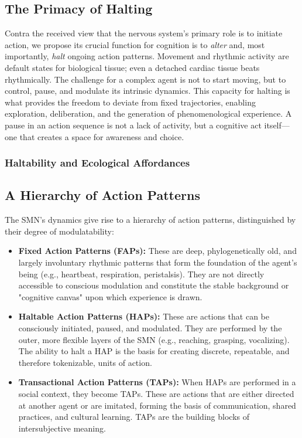 \documentclass[10pt,letterpaper]{article}
\begin{document}
\subsection*{The Primacy of Halting}
Contra the received view that the nervous system's primary role is to initiate action, we propose its crucial function for cognition is to \textit{alter} and, most importantly, \textit{halt} ongoing action patterns. Movement and rhythmic activity are default states for biological tissue; even a detached cardiac tissue beats rhythmically. The challenge for a complex agent is not to start moving, but to control, pause, and modulate its intrinsic dynamics. This capacity for halting is what provides the freedom to deviate from fixed trajectories, enabling exploration, deliberation, and the generation of phenomenological experience. A pause in an action sequence is not a lack of activity, but a cognitive act itself—one that creates a space for awareness and choice.

\subsubsection*{Haltability and Ecological Affordances}

\subsection*{A Hierarchy of Action Patterns}
The SMN's dynamics give rise to a hierarchy of action patterns, distinguished by their degree of modulatability:
\begin{itemize}
    \item \textbf{Fixed Action Patterns (FAPs):} These are deep, phylogenetically old, and largely involuntary rhythmic patterns that form the foundation of the agent's being (e.g., heartbeat, respiration, peristalsis). They are not directly accessible to conscious modulation and constitute the stable background or "cognitive canvas" upon which experience is drawn.
    \item \textbf{Haltable Action Patterns (HAPs):} These are actions that can be consciously initiated, paused, and modulated. They are performed by the outer, more flexible layers of the SMN (e.g., reaching, grasping, vocalizing). The ability to halt a HAP is the basis for creating discrete, repeatable, and therefore tokenizable, units of action.
    \item \textbf{Transactional Action Patterns (TAPs):} When HAPs are performed in a social context, they become TAPs. These are actions that are either directed at another agent or are imitated, forming the basis of communication, shared practices, and cultural learning. TAPs are the building blocks of intersubjective meaning.
\end{itemize}
\end{document}
